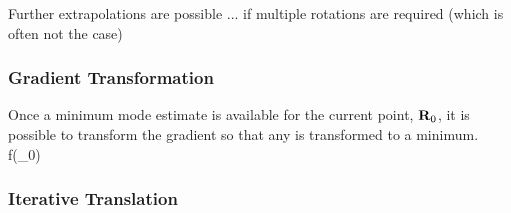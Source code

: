 Further extrapolations are possible ... if multiple rotations are required (which is often not the case) \missing

\incomplete

\subsubsection{Gradient Transformation}
Once a minimum mode estimate is available for the current point, ${\mathrm{\mathbf{\bm{R}}}}_0$, it is possible to transform the gradient so that any  is transformed to a minimum.
\nabla{}f(\vR_0)
\eeq


\incomplete

\subsubsection{Iterative Translation}

\incomplete

